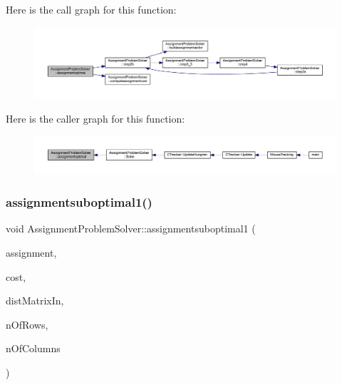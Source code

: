 Here is the call graph for this function\+:\nopagebreak
\begin{figure}[H]
\begin{center}
\leavevmode
\includegraphics[width=350pt]{class_assignment_problem_solver_a5b84a5167984db1050821926f52b5187_cgraph}
\end{center}
\end{figure}
Here is the caller graph for this function\+:\nopagebreak
\begin{figure}[H]
\begin{center}
\leavevmode
\includegraphics[width=350pt]{class_assignment_problem_solver_a5b84a5167984db1050821926f52b5187_icgraph}
\end{center}
\end{figure}
\mbox{\label{class_assignment_problem_solver_ae8fddfafc7387f3597493f02e8366883}} 
\subsubsection{\texorpdfstring{assignmentsuboptimal1()}{assignmentsuboptimal1()}}
{\footnotesize\ttfamily void Assignment\+Problem\+Solver\+::assignmentsuboptimal1 (\begin{DoxyParamCaption}\item[{\mbox{\hyperlink{_hungarian_alg_8h_ad7b9f569a9adbd958c668a36b6884ffd}{assignments\+\_\+t}} \&}]{assignment,  }\item[{\mbox{\hyperlink{defines_8h_a7ce9c8817b42ab418e61756f579549ab}{track\+\_\+t}} \&}]{cost,  }\item[{const \mbox{\hyperlink{_hungarian_alg_8h_af6ab0ee8259a51215f62e8f96416d5bb}{dist\+Matrix\+\_\+t}} \&}]{dist\+Matrix\+In,  }\item[{size\+\_\+t}]{n\+Of\+Rows,  }\item[{size\+\_\+t}]{n\+Of\+Columns }\end{DoxyParamCaption})\hspace{0.3cm}{\ttfamily [private]}}




